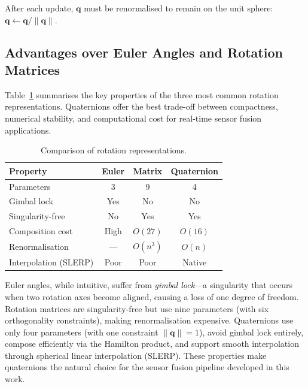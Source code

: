 \noindent After each update, $\mathbf{q}$ must be renormalised to remain on the
unit sphere: $\mathbf{q} \leftarrow \mathbf{q} / \|\mathbf{q}\|$.

\subsection{Advantages over Euler Angles and Rotation Matrices}
\label{sec:quat:advantages}

Table~\ref{tab:rotation_comparison} summarises the key properties of the
three most common rotation representations.  Quaternions offer the best
trade-off between compactness, numerical stability, and computational cost
for real-time sensor fusion applications.

\begin{table}[t]
  \centering
  \caption{Comparison of rotation representations.}
  \label{tab:rotation_comparison}
  \small
  \begin{tabular}{@{}lccc@{}}
    \toprule
    \textbf{Property} & \textbf{Euler} & \textbf{Matrix} & \textbf{Quaternion} \\
    \midrule
    Parameters             & 3     & 9     & 4 \\
    Gimbal lock            & Yes   & No    & No \\
    Singularity-free       & No    & Yes   & Yes \\
    Composition cost       & High  & $O(27)$ & $O(16)$ \\
    Renormalisation        & ---   & $O(n^3)$ & $O(n)$ \\
    Interpolation (SLERP)  & Poor  & Poor  & Native \\
    \bottomrule
  \end{tabular}
\end{table}

Euler angles, while intuitive, suffer from \emph{gimbal lock}---a
singularity that occurs when two rotation axes become aligned, causing a
loss of one degree of freedom.  Rotation matrices are singularity-free
but use nine parameters (with six orthogonality constraints), making
renormalisation expensive.  Quaternions use only four parameters (with
one constraint $\|\mathbf{q}\|=1$), avoid gimbal lock entirely, compose
efficiently via the Hamilton product, and support smooth interpolation
through spherical linear interpolation (SLERP).  These properties make
quaternions the natural choice for the sensor fusion pipeline developed
in this work.
